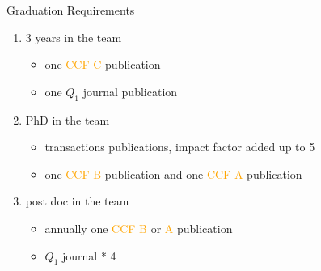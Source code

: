 \documentclass[
 size=14pt,
 paper=smartboard,  %
 mode=present, 		%
 display=slides, 	%
 style=tuliplab,  	%
 pauseslide,
 fleqn,leqno]{powerdot}{}
\begin{document}
%
%


\begin{slide}[toc=,bm=]{Graduation Requirements}
\begin{enumerate}
\item<1-> 3 years in the team
    \begin{itemize}
        \item one \textcolor{orange}{CCF C} publication
        \item one $Q_1$ journal publication
    \end{itemize}
\item<2-> PhD in the team
    \begin{itemize}
        \item transactions publications, impact factor added up to 5
        \item one \textcolor{orange}{CCF B} publication and
        one \textcolor{orange}{CCF A} publication
    \end{itemize}
\item<3-> post doc in the team
    \begin{itemize}
    \item annually one \textcolor{orange}{CCF B} or \textcolor{orange}{A} publication
    \item $Q_1$ journal * 4
    \end{itemize}
\end{enumerate}
\end{slide}
\end{document}
